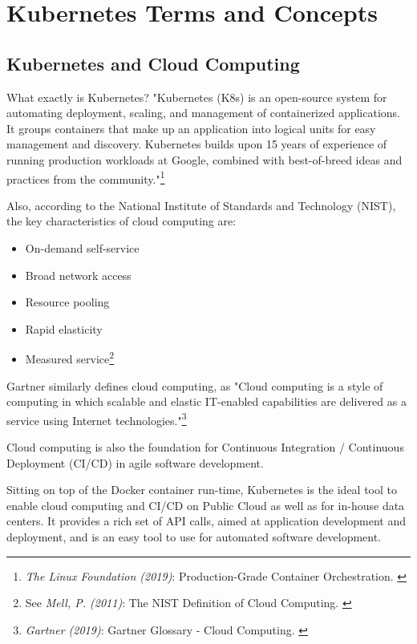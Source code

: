 %
%

\pagebreak
\section{Kubernetes Terms and Concepts}

\onehalfspacing

\subsection{Kubernetes and Cloud Computing}

What exactly is Kubernetes? "Kubernetes (K8s) is an open-source system for automating deployment, scaling, and management of containerized applications.
It groups containers that make up an application into logical units for easy management and discovery. Kubernetes builds upon 15 years of experience of running production workloads at Google, combined with best-of-breed ideas and practices from the community."\footnote{\textit{The Linux Foundation (2019)}: Production-Grade Container Orchestration. \cite{kubernetes}}

Also, according to the National Institute of Standards and Technology (NIST), the key characteristics of cloud computing are: 
\begin{itemize}
\item On-demand self-service
\item Broad network access
\item Resource pooling
\item Rapid elasticity
\item Measured service\footnote{See \textit{Mell, P. (2011)}: The NIST Definition of Cloud Computing. \cite{sp800-145}}
\end{itemize}

Gartner similarly defines cloud computing, as "Cloud computing is a style of computing in which scalable and elastic IT-enabled capabilities are delivered as a service using Internet technologies."\footnote{\textit{Gartner (2019)}: Gartner Glossary - Cloud Computing. \cite{gartnerGlossary}}

Cloud computing is also the foundation for Continuous Integration / Continuous Deployment (CI/CD) in agile software development.

Sitting on top of the Docker container run-time, Kubernetes is the ideal tool to enable cloud computing and CI/CD on Public Cloud as well as for in-house data centers. It provides a rich set of API calls, aimed at application development and deployment, and is an easy tool to use for automated software development.

